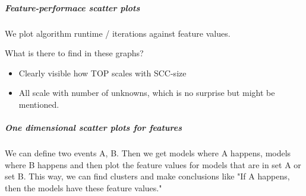 \subparagraph*{Feature-performace scatter plots}
We plot algorithm runtime / iterations against feature values.

What is there to find in these graphs?
\begin{itemize}
    \item Clearly visible how TOP scales with SCC-size
    \item All scale with number of unknowns, which is no surprise but might be mentioned.
\end{itemize}

\subparagraph*{One dimensional scatter plots for features}
We can define two events A, B. Then we get models where A happens, models where B happens and then plot the feature values for models that are in set A or set B.
This way, we can find clusters and make conclusions like "If A happens, then the models have these feature values."
\fi